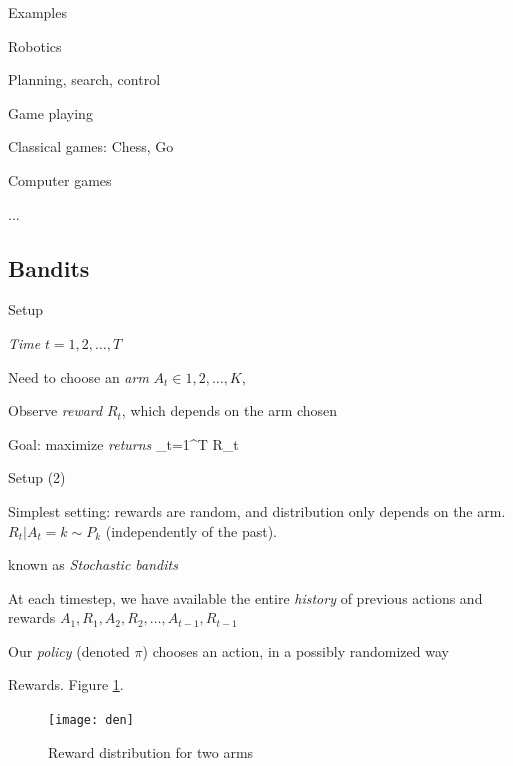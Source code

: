\documentclass[english]{article}
\begin{document}
\eitem



\item {Examples}
\bitem
\item Robotics
\bitem
\item Planning, search, control 
\eitem
\item Game playing
\bitem
\item Classical games: Chess, Go
\item Computer games
\eitem
\item ...
\eitem

\eenum

\subsection{Bandits}

\benum

\item {Setup}
\bitem
\item \emph{Time} $t=1,2,\ldots,T$
\item Need to choose an \emph{arm} $A_t \in  1, 2, \ldots, K$, 
\item Observe \emph{reward} $R_t$, which depends on the arm chosen
\item Goal: maximize \emph{returns}
\beqs
\max \sum_{t=1}^T R_t
\eeqs
\eitem



\item {Setup (2)}
\bitem
\item Simplest setting: rewards are random, and distribution only depends on the arm. $R_t|A_t = k \sim P_k$ (independently of the past). 
\item known as \emph{Stochastic bandits}
\item At each timestep, we have available the entire \emph{history} of previous actions and rewards $A_1,R_1,A_2,R_2,\ldots, A_{t-1}, R_{t-1}$
\item Our \emph{policy} (denoted $\pi$) chooses an action, in a possibly randomized way 
\eitem



\item {Rewards}. Figure \ref{rewards}.
\begin{figure}[h!]
\begin{center}
\texttt{[image: den]}
    \caption{Reward distribution for two arms}
    \label{rewards}
\end{center}
\end{figure}
\end{document}
